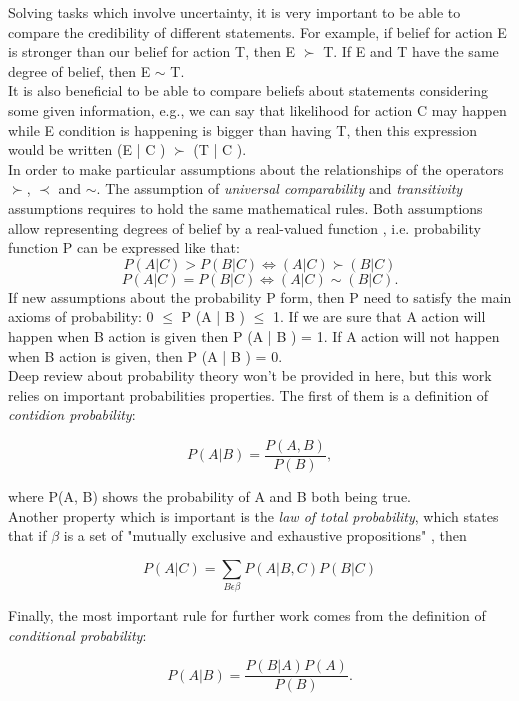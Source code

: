 Solving tasks which involve uncertainty, it is very important to be able to compare the credibility of different statements. For example, if belief for action E is stronger than our belief for action T, then E $\succ$ T. If E and T have the same degree of belief, then E $\sim$ T. \\
It is also beneficial to be able to compare beliefs about statements considering some given information, e.g., we can say that likelihood for action C may happen while E condition is happening is bigger than having T, then this expression would be written (E | C ) $\succ$ (T | C ). \\
In order to make particular assumptions about the relationships of the operators $\succ$, $\prec$ and $\sim$. The assumption of \textit{universal comparability} and \textit{transitivity} assumptions requires to hold the same mathematical rules. Both assumptions allow representing degrees of belief by a real-valued function \cite{BOOK}, i.e. probability function P can be expressed like that:
\[ P(A|C) > P(B|C) \iff (A|C) \succ (B|C) \]
\[P(A|C) = P(B|C) \iff (A|C) \sim (B|C). \]
If new assumptions about the probability P form, then P need to satisfy the main axioms of probability: 0 $\leqslant$ P (A | B ) $\leqslant$ 1. If we are sure that A action will happen when B action is given then P (A | B ) = 1. If A action will not happen when B action is given, then
P (A | B ) = 0. \\
Deep review about probability theory won't be provided in here, but this work relies on important probabilities properties. The first of them is a definition of \textit{contidion probability}:

\begin{equation}
P(A|B)=\frac{P(A,B)}{P(B)},
\end{equation}

where P(A, B) shows the probability of A and B both being true. \\
Another property which is important is the \textit{law of total probability}, which states that if $\beta$ is a set of "mutually exclusive and exhaustive propositions" \cite{BOOK}, then

\begin{equation}
P(A|C)=\displaystyle \sum_{B \epsilon \beta}{P(A|B,C)P(B|C)}
\end{equation}

Finally, the most important rule for further work comes from the definition of \textit{conditional probability}:

\begin{equation}
P(A|B)=\frac{P(B|A)P(A)}{P(B)}.
\end{equation}

